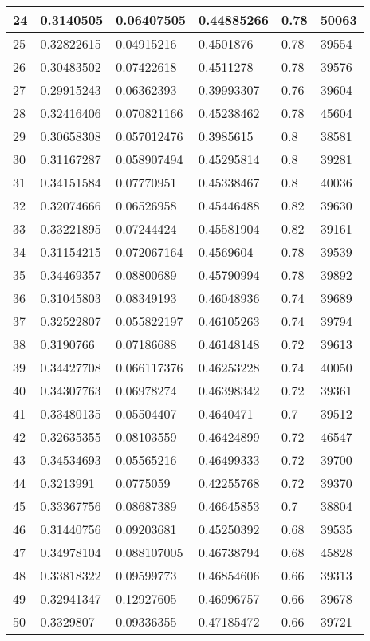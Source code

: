 \begin{longtable}{|l|l|l|l|l|l|}
24 & 0.3140505 & 0.06407505 & 0.44885266 & 0.78 & 50063 \\ \hline 
25 & 0.32822615 & 0.04915216 & 0.4501876 & 0.78 & 39554 \\ \hline 
26 & 0.30483502 & 0.07422618 & 0.4511278 & 0.78 & 39576 \\ \hline 
27 & 0.29915243 & 0.06362393 & 0.39993307 & 0.76 & 39604 \\ \hline 
28 & 0.32416406 & 0.070821166 & 0.45238462 & 0.78 & 45604 \\ \hline 
29 & 0.30658308 & 0.057012476 & 0.3985615 & 0.8 & 38581 \\ \hline 
30 & 0.31167287 & 0.058907494 & 0.45295814 & 0.8 & 39281 \\ \hline 
31 & 0.34151584 & 0.07770951 & 0.45338467 & 0.8 & 40036 \\ \hline 
32 & 0.32074666 & 0.06526958 & 0.45446488 & 0.82 & 39630 \\ \hline 
33 & 0.33221895 & 0.07244424 & 0.45581904 & 0.82 & 39161 \\ \hline 
34 & 0.31154215 & 0.072067164 & 0.4569604 & 0.78 & 39539 \\ \hline 
35 & 0.34469357 & 0.08800689 & 0.45790994 & 0.78 & 39892 \\ \hline 
36 & 0.31045803 & 0.08349193 & 0.46048936 & 0.74 & 39689 \\ \hline 
37 & 0.32522807 & 0.055822197 & 0.46105263 & 0.74 & 39794 \\ \hline 
38 & 0.3190766 & 0.07186688 & 0.46148148 & 0.72 & 39613 \\ \hline 
39 & 0.34427708 & 0.066117376 & 0.46253228 & 0.74 & 40050 \\ \hline 
40 & 0.34307763 & 0.06978274 & 0.46398342 & 0.72 & 39361 \\ \hline 
41 & 0.33480135 & 0.05504407 & 0.4640471 & 0.7 & 39512 \\ \hline 
42 & 0.32635355 & 0.08103559 & 0.46424899 & 0.72 & 46547 \\ \hline 
43 & 0.34534693 & 0.05565216 & 0.46499333 & 0.72 & 39700 \\ \hline 
44 & 0.3213991 & 0.0775059 & 0.42255768 & 0.72 & 39370 \\ \hline 
45 & 0.33367756 & 0.08687389 & 0.46645853 & 0.7 & 38804 \\ \hline 
46 & 0.31440756 & 0.09203681 & 0.45250392 & 0.68 & 39535 \\ \hline 
47 & 0.34978104 & 0.088107005 & 0.46738794 & 0.68 & 45828 \\ \hline 
48 & 0.33818322 & 0.09599773 & 0.46854606 & 0.66 & 39313 \\ \hline 
49 & 0.32941347 & 0.12927605 & 0.46996757 & 0.66 & 39678 \\ \hline 
50 & 0.3329807 & 0.09336355 & 0.47185472 & 0.66 & 39721 \\ \hline 
\end{longtable}